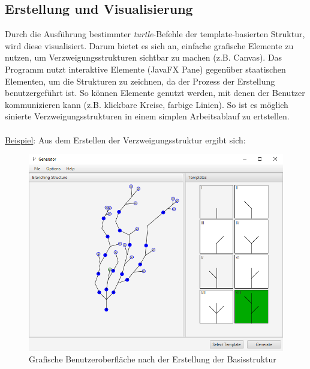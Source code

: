 \subsection*{Erstellung und Visualisierung}
Durch die Ausführung bestimmter \textit{turtle}-Befehle der template-basierten Struktur, wird diese visualisiert.
Darum bietet es sich an, einfache grafische Elemente zu nutzen, um Verzweigungsstrukturen sichtbar zu machen
(z.B. Canvas).
Das Programm nutzt interaktive Elemente (JavaFX Pane) gegenüber staatischen Elementen, um die Strukturen zu zeichnen,
da der Prozess der Erstellung benutzergeführt ist.
So können Elemente genutzt werden, mit denen der Benutzer kommunizieren kann (z.B. klickbare Kreise, farbige
Linien).
So ist es möglich sinierte Verzweigungsstrukturen in einem simplen Arbeitsablauf zu ertstellen.\\~\\
\underline{Beispiel}: Aus dem Erstellen der Verzweigungsstruktur ergibt sich:
\begin{figure}[H]
    \centering
    \includegraphics[width=12cm]{../images/evaluierung_inferrieren.png}
    \caption{Grafische Benutzeroberfläche nach der Erstellung der Basisstruktur}
\end{figure}

